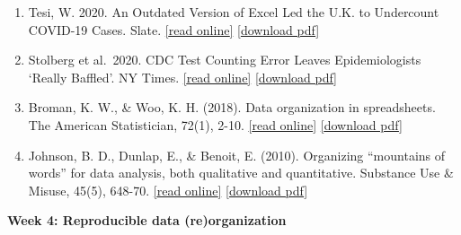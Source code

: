 \documentclass[
  12pt,
]{article}
\begin{document}
\begin{enumerate}
\def\labelenumi{\arabic{enumi}.}
\item
  Tesi, W. 2020. An Outdated Version of Excel Led the U.K. to Undercount
  COVID-19 Cases. Slate.
  \href{https://slate.com/technology/2020/10/u-k-covid-19-spike-caused-by-microsoft-excel-error.html}{{[}read
  online{]}}
  \href{https://github.com/BrunaLab/LAS6292_DataManagement/blob/master/Assigned_Readings/Tesi_2020.pdf}{{[}download
  pdf{]}}
\item
  Stolberg et al.~2020. CDC Test Counting Error Leaves Epidemiologists
  `Really Baffled'. NY Times.
  \href{https://www.nytimes.com/2020/05/22/us/politics/coronavirus-tests-cdc.html?referringSource=articleShare}{{[}read
  online{]}}
  \href{https://github.com/BrunaLab/LAS6292_DataManagement/blob/master/Assigned_Readings/Stolberg_2020_NYT.pdf}{{[}download
  pdf{]}}
\item
  Broman, K. W., \& Woo, K. H. (2018). Data organization in
  spreadsheets. The American Statistician, 72(1), 2-10.
  \href{https://www.tandfonline.com/doi/full/10.1080/00031305.2017.1375989}{{[}read
  online{]}}
  \href{https://github.com/BrunaLab/LAS6292_DataManagement/blob/master/Assigned_Readings/Broman\%26Woo_2018.pdf}{{[}download
  pdf{]}}
\item
  Johnson, B. D., Dunlap, E., \& Benoit, E. (2010). Organizing
  ``mountains of words'' for data analysis, both qualitative and
  quantitative. Substance Use \& Misuse, 45(5), 648-70.
  \href{https://www.tandfonline.com/doi/abs/10.3109/10826081003594757?journalCode=isum20}{{[}read
  online{]}}
  \href{https://github.com/BrunaLab/LAS6292_DataManagement/blob/master/Assigned_Readings/Johnson_etal_2010.pdf}{{[}download
  pdf{]}}
\end{enumerate}

\textbf{Week 4: Reproducible data (re)organization}
\end{document}
